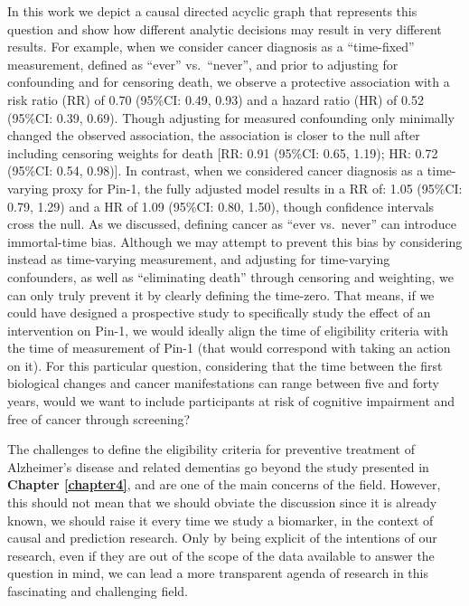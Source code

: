 \documentclass[
]{book}
\begin{document}
In this work we depict a causal directed acyclic graph that represents this question and show how different analytic decisions may result in very different results. For example, when we consider cancer diagnosis as a ``time-fixed'' measurement, defined as ``ever'' vs.~``never'', and prior to adjusting for confounding and for censoring death, we observe a protective association with a risk ratio (RR) of 0.70 (95\%CI: 0.49, 0.93) and a hazard ratio (HR) of 0.52 (95\%CI: 0.39, 0.69). Though adjusting for measured confounding only minimally changed the observed association, the association is closer to the null after including censoring weights for death {[}RR: 0.91 (95\%CI: 0.65, 1.19); HR: 0.72 (95\%CI: 0.54, 0.98){]}. In contrast, when we considered cancer diagnosis as a time-varying proxy for Pin-1, the fully adjusted model results in a RR of: 1.05 (95\%CI: 0.79, 1.29) and a HR of 1.09 (95\%CI: 0.80, 1.50), though confidence intervals cross the null.
As we discussed, defining cancer as ``ever vs.~never'' can introduce immortal-time bias. Although we may attempt to prevent this bias by considering instead as time-varying measurement, and adjusting for time-varying confounders, as well as ``eliminating death'' through censoring and weighting, we can only truly prevent it by clearly defining the time-zero. That means, if we could have designed a prospective study to specifically study the effect of an intervention on Pin-1, we would ideally align the time of eligibility criteria with the time of measurement of Pin-1 (that would correspond with taking an action on it). For this particular question, considering that the time between the first biological changes and cancer manifestations can range between five and forty years\autocite{nadler2013}, would we want to include participants at risk of cognitive impairment and free of cancer through screening?

The challenges to define the eligibility criteria for preventive treatment of Alzheimer's disease and related dementias go beyond the study presented in \textbf{Chapter \ref{chapter4}}, and are one of the main concerns of the field. However, this should not mean that we should obviate the discussion since it is already known, we should raise it every time we study a biomarker, in the context of causal and prediction research. Only by being explicit of the intentions of our research, even if they are out of the scope of the data available to answer the question in mind, we can lead a more transparent agenda of research in this fascinating and challenging field.
\end{document}
